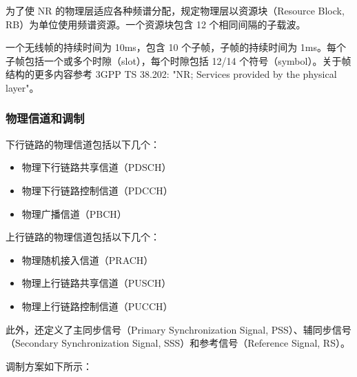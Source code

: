 \documentclass[cn,hazy,blue,14pt,screen,device=normal]{elegantnote}
\begin{document}
为了使 NR 的物理层适应各种频谱分配，规定物理层以资源块（Resource Block, RB）为单位使用频谱资源。一个资源块包含 12 个相同间隔的子载波。

一个无线帧的持续时间为 10ms，包含 10 个子帧，子帧的持续时间为 1ms。每个子帧包括一个或多个时隙（slot），每个时隙包括 12/14 个符号（symbol）。关于帧结构的更多内容参考 3GPP TS 38.202: "NR; Services provided by the physical layer"。

\subsubsection{ 物理信道和调制 }
下行链路的物理信道包括以下几个：

\begin{itemize}[leftmargin=2cm]
	\item 物理下行链路共享信道（PDSCH）
	\item 物理下行链路控制信道（PDCCH）
	\item 物理广播信道（PBCH）
\end{itemize}

上行链路的物理信道包括以下几个：
\begin{itemize}[leftmargin=2cm]
	\item 物理随机接入信道（PRACH）
	\item 物理上行链路共享信道（PUSCH）
	\item 物理上行链路控制信道（PUCCH）
\end{itemize}

此外，还定义了主同步信号（Primary Synchronization Signal, PSS）、辅同步信号（Secondary Synchronization Signal, SSS）和参考信号（Reference Signal, RS）。

调制方案如下所示：

\begin{table}[!hbp]
\end{table}
\end{document}
